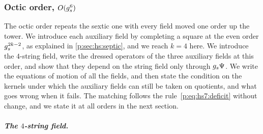\subsubsection{Octic order, \texorpdfstring{$O(g_s^6)$}{O(gs**6)}}
\label{p:sec:hs:octic}

The octic order repeats the sextic one with every field moved one order up the tower.
We introduce each auxiliary field by completing a square at the even order $g_s^{2 k - 2}$, as explained in \cref{p:sec:hs:septic}, and we reach $k = 4$ here.
We introduce the $4$-string field, write the dressed operators of the three auxiliary fields at this order, and show that they depend on the string field only through $g_s \Psi$.
We write the equations of motion of all the fields, and then state the condition on the kernels under which the auxiliary fields can still be taken on quotients, and what goes wrong when it fails.
The matching follows the rule~\eqref{p:eq:hs7:deficit} without change, and we state it at all orders in the next section.

\subparagraph{The $4$-string field.}

